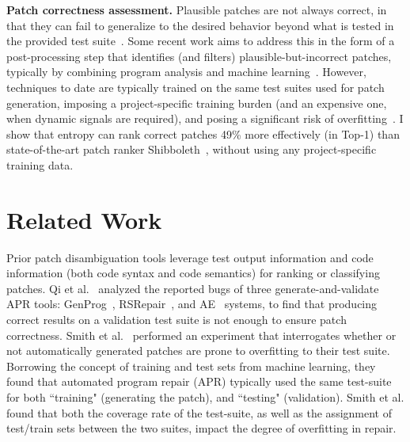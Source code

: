 \documentclass[12pt,openany,oneside,table]{cmuthesis}
\begin{document}
\vspace{1ex} 
\noindent\textbf{Patch correctness assessment.}
Plausible patches are not always correct, in that they can fail to generalize to
the desired behavior beyond what is tested in the provided test 
suite~\cite{CURE}.  Some recent work aims to address this in the form of a 
post-processing step that identifies (and filters) plausible-but-incorrect
patches, typically by combining program analysis and machine
learning~\cite{Panther, Shibboleth, yang2023large}.  However, techniques to date
are typically trained on the same test suites used for patch generation,
imposing a project-specific training burden (and an expensive one, when dynamic
signals are required), and posing a significant risk of overfitting~\cite{CURE, yang2023large}.  
I show that entropy can rank correct patches 49\% more effectively (in Top-1) than state-of-the-art patch ranker Shibboleth~\cite{Shibboleth}, without using any project-specific training data.

\section{Related Work}

Prior patch disambiguation tools leverage test output information and code information (both code syntax and code semantics) for ranking or classifying patches. Qi et al.~\cite{qi2015analysis} analyzed the reported bugs of three generate-and-validate APR tools: GenProg~\cite{genprog}, RSRepair~\cite{rsrepair}, and AE~\cite{ae} systems, to find that producing correct results on a validation test suite is not enough to ensure patch correctness. Smith et al.~\cite{CURE} performed an experiment that interrogates whether or not automatically generated patches are prone to overfitting to their test suite. Borrowing the concept of training and test sets from machine learning, they found that automated program repair (APR) typically used the same test-suite for both ``training" (generating the patch), and ``testing" (validation). Smith et al. found that both the coverage rate of the test-suite, as well as the assignment of test/train sets between the two suites, impact the degree of overfitting in repair.
\end{document}
